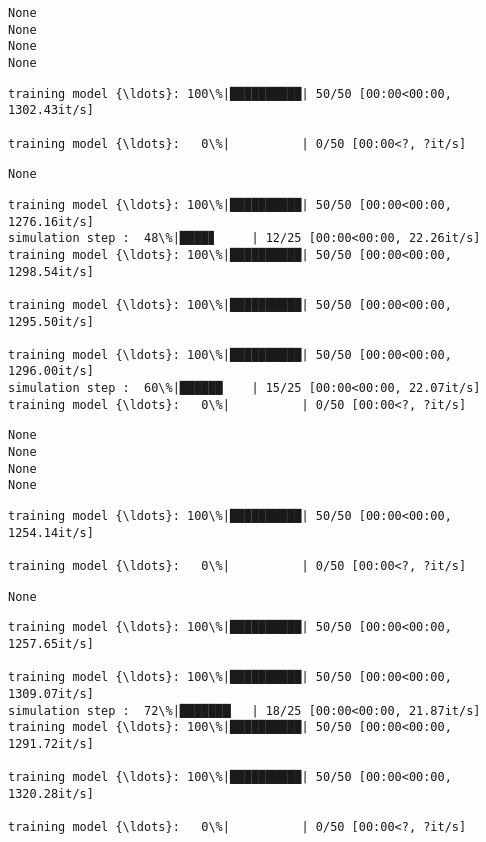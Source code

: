 \documentclass[11pt]{article}
\begin{document}
    \begin{Verbatim}[commandchars=\\\{\}]
None
None
None
None
    \end{Verbatim}

    \begin{Verbatim}[commandchars=\\\{\}]
training model {\ldots}: 100\%|██████████| 50/50 [00:00<00:00, 1302.43it/s]

training model {\ldots}:   0\%|          | 0/50 [00:00<?, ?it/s]
    \end{Verbatim}

    \begin{Verbatim}[commandchars=\\\{\}]
None
    \end{Verbatim}

    \begin{Verbatim}[commandchars=\\\{\}]
training model {\ldots}: 100\%|██████████| 50/50 [00:00<00:00, 1276.16it/s]
simulation step :  48\%|████▊     | 12/25 [00:00<00:00, 22.26it/s]
training model {\ldots}: 100\%|██████████| 50/50 [00:00<00:00, 1298.54it/s]

training model {\ldots}: 100\%|██████████| 50/50 [00:00<00:00, 1295.50it/s]

training model {\ldots}: 100\%|██████████| 50/50 [00:00<00:00, 1296.00it/s]
simulation step :  60\%|██████    | 15/25 [00:00<00:00, 22.07it/s]
training model {\ldots}:   0\%|          | 0/50 [00:00<?, ?it/s]
    \end{Verbatim}

    \begin{Verbatim}[commandchars=\\\{\}]
None
None
None
None
    \end{Verbatim}

    \begin{Verbatim}[commandchars=\\\{\}]
training model {\ldots}: 100\%|██████████| 50/50 [00:00<00:00, 1254.14it/s]

training model {\ldots}:   0\%|          | 0/50 [00:00<?, ?it/s]
    \end{Verbatim}

    \begin{Verbatim}[commandchars=\\\{\}]
None
    \end{Verbatim}

    \begin{Verbatim}[commandchars=\\\{\}]
training model {\ldots}: 100\%|██████████| 50/50 [00:00<00:00, 1257.65it/s]

training model {\ldots}: 100\%|██████████| 50/50 [00:00<00:00, 1309.07it/s]
simulation step :  72\%|███████▏  | 18/25 [00:00<00:00, 21.87it/s]
training model {\ldots}: 100\%|██████████| 50/50 [00:00<00:00, 1291.72it/s]

training model {\ldots}: 100\%|██████████| 50/50 [00:00<00:00, 1320.28it/s]

training model {\ldots}:   0\%|          | 0/50 [00:00<?, ?it/s]
    \end{Verbatim}
\end{document}
